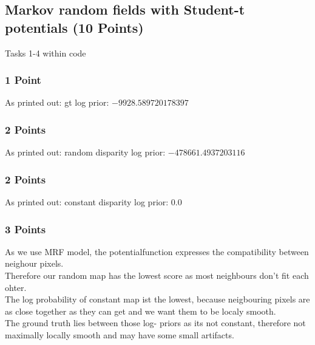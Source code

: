 \newif\ifvimbug
\vimbugfalse

\ifvimbug

\fi


\subsection{Markov random fields with Student-t potentials (10 Points)}
Tasks 1-4 within code
\setcounter{subsubsection}{1}
\subsubsection{1 Point}
As printed out:
gt log prior:                   $-9928.589720178397$\\
\subsubsection{2 Points}
As printed out:
random disparity log prior:    $ -478661.4937203116$\\
\subsubsection{2 Points}
As printed out:
constant disparity log prior:  $ 0.0$\\
\subsubsection{3 Points}
As we use MRF model, the potentialfunction expresses the compatibility between neighour pixels.\\
Therefore our random map has the lowest score as most neighbours don't fit each ohter.\\ 
The log probability of constant map ist the lowest, because neigbouring pixels are as close together as they can get and we want them to be localy smooth.\\
The ground truth lies between those log- priors as its not constant, therefore not maximally locally smooth and may have some small artifacts.\\